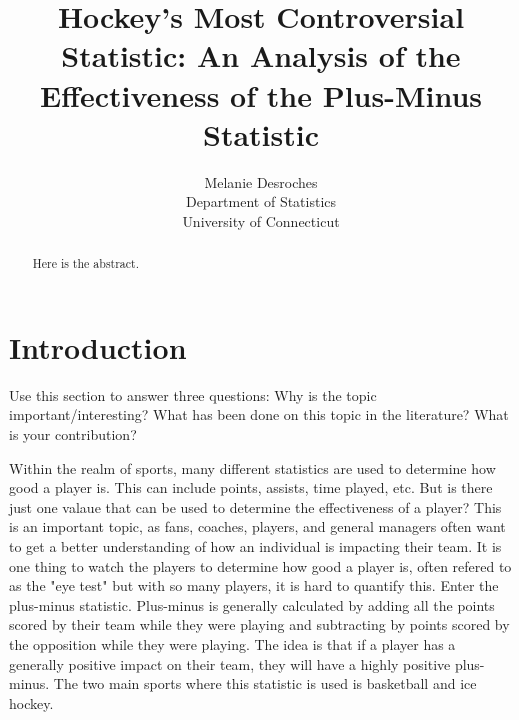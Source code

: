 \documentclass[12pt]{article}
\title{Hockey's Most Controversial Statistic: An Analysis of the Effectiveness of the Plus-Minus Statistic}
\author{Melanie Desroches\\
  Department of Statistics\\
  University of Connecticut
}
\begin{document}
\maketitle

\begin{abstract}
Here is the abstract.  
\end{abstract}

\doublespacing

\section{Introduction}
\label{sec:intro}

Use this section to answer three questions:
Why is the topic important/interesting?
What has been done on this topic in the literature?
What is your contribution?

Within the realm of sports, many different statistics are used to determine how good a player is. This can include points,
assists, time played, etc. But is there just one valaue that can be used to determine the effectiveness of a player? This is an 
important topic, as fans, coaches, players, and general managers often want to get a better understanding of how an individual is
impacting their team. It is one thing to watch the players to determine how good a player is, often refered to as the "eye test" but 
with so many players, it is hard to quantify this. Enter the plus-minus statistic. Plus-minus is generally calculated by adding all the points
scored by their team while they were playing and subtracting by points scored by the opposition while they were playing. The idea is that 
if a player has a generally positive impact on their team, they will have a highly positive plus-minus. The two main sports where this
statistic is used is basketball and ice hockey. 
\end{document}
